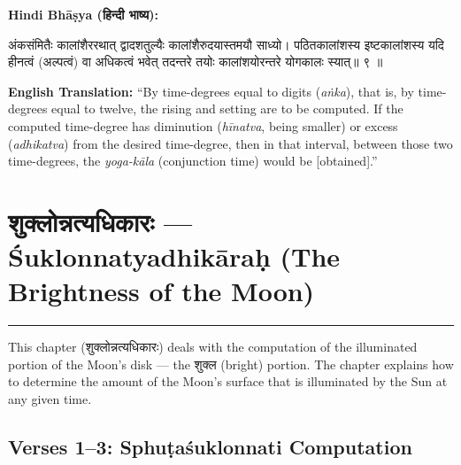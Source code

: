 \documentclass[11pt,a4paper]{article}
\newcommand{\dev}[1]{{\devanagarifont #1}}
\newenvironment{sanskritverse}{%
  \begin{center}\begin{minipage}{0.95\textwidth}
  \setlength{\leftskip}{1em}
  \setlength{\rightskip}{1em}
  \dev
}{\end{minipage}\end{center}}
\newenvironment{paracol}[1]{\begingroup}{\endgroup}
\newcommand{\switchcolumn}[1][]{%
  \ifnum#1=0\relax\else\par\nobreak\vspace{0.5em}\par\nobreak\fi%
}
\begin{document}
\vspace{0.5em}

\begin{paracol}{2}

\noindent\textbf{Hindi Bhāṣya (\dev{हिन्दी भाष्य}):}
\begin{sanskritverse}
अंकसंमितैः कालांशैररथात् द्वादशतुल्यैः कालांशैरुदयास्तमयौ साध्यो। पठितकालांशस्य
इष्टकालांशस्य यदि हीनत्वं (अल्पत्वं) वा अधिकत्वं भवेत् तदन्तरे तयोः कालांशयोरन्तरे
योगकालः स्यात्॥ ९ ॥
\end{sanskritverse}

\switchcolumn

\textbf{English Translation:} ``By time-degrees equal to digits (\textit{aṅka}), that is, by time-degrees equal to twelve, the rising and setting are to be computed. If the computed time-degree has diminution (\textit{hīnatva}, being smaller) or excess (\textit{adhikatva}) from the desired time-degree, then in that interval, between those two time-degrees, the \textit{yoga-kāla} (conjunction time) would be [obtained].''

\end{paracol}

\newpage

\section{\texorpdfstring{{\devanagarifont शुक्लोन्नत्यधिकारः} — Śuklonnatyadhikāraḥ (The Brightness of the Moon)}{Śuklonnatyadhikāraḥ (The Brightness of the Moon)}}
\label{sec:shuklonnati}

\begin{center}
\textcolor{rulecolor}{\rule{0.8\textwidth}{0.5pt}}
\end{center}

This chapter (\dev{शुक्लोन्नत्यधिकारः}) deals with the computation of the illuminated portion of the Moon's disk --- the \dev{शुक्ल} (bright) portion. The chapter explains how to determine the amount of the Moon's surface that is illuminated by the Sun at any given time.

\subsection{Verses 1--3: Sphuṭaśuklonnati Computation}
\end{document}
